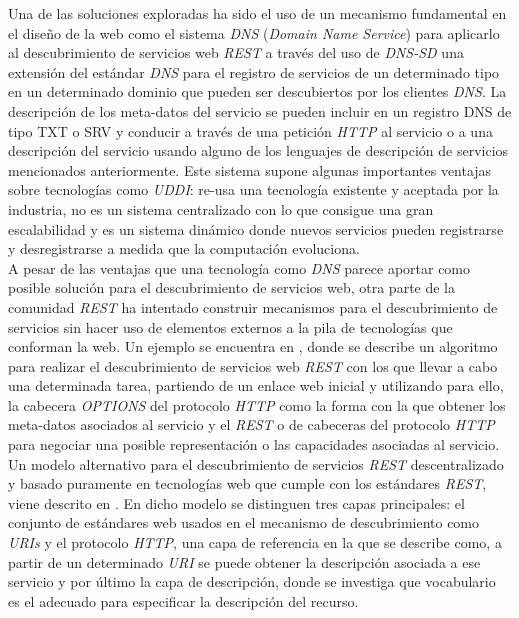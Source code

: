 Una de las soluciones exploradas ha sido el uso de un mecanismo fundamental en el dise\~no de la web como el sistema \textit{DNS} (\textit{Domain Name Service}) para aplicarlo al descubrimiento de servicios web \textit{REST} \cite{jara2012light} a trav\'es del uso de \textit{DNS-SD} una extensi\'on del est\'andar \textit{DNS} para el registro de servicios de un determinado tipo en un determinado dominio que pueden ser descubiertos por los clientes \textit{DNS}. La descripci\'on de los meta-datos del servicio se pueden incluir en un registro DNS de tipo TXT o SRV y conducir a trav\'es de una petici\'on \textit{HTTP} al servicio o a una descripci\'on del servicio usando alguno de los lenguajes de descripci\'on de servicios mencionados anteriormente. Este sistema supone algunas importantes ventajas sobre tecnolog\'ias como \textit{UDDI}: re-usa una tecnolog\'ia existente y aceptada por la industria, no es un sistema centralizado con lo que consigue una gran escalabilidad y es un sistema din\'amico donde nuevos servicios pueden registrarse y desregistrarse a medida que la computaci\'on evoluciona.\\

A pesar de las ventajas que una tecnolog\'ia como \textit{DNS} parece aportar como posible soluci\'on para el descubrimiento de servicios web, otra parte de la comunidad \textit{REST} ha intentado construir mecanismos para el descubrimiento de servicios sin hacer uso de elementos externos a la pila de tecnolog\'ias que conforman la web. Un ejemplo se encuentra en \cite{verborgh2011description}, donde se describe un algoritmo para realizar el descubrimiento de servicios web \textit{REST} con los que llevar a cabo una determinada tarea, partiendo de un enlace web inicial y utilizando para ello, la cabecera \textit{OPTIONS} del protocolo \textit{HTTP} como la forma con la que obtener los meta-datos asociados al servicio y el \textit{REST} o de cabeceras del protocolo \textit{HTTP} para negociar una posible representaci\'on o las capacidades asociadas al servicio.
Un modelo alternativo para el descubrimiento de servicios \textit{REST} descentralizado y basado puramente en tecnolog\'ias web que cumple con los est\'andares \textit{REST}, viene descrito en \cite{umbrich2009discovering}. En dicho modelo se distinguen tres capas principales: el conjunto de est\'andares web usados en el mecanismo de descubrimiento como \textit{URIs} y el protocolo \textit{HTTP}, una capa de referencia en la que se describe como, a partir de un determinado \textit{URI} se puede obtener la descripci\'on asociada a ese servicio y por \'ultimo la capa de descripci\'on, donde se investiga que vocabulario es el adecuado para especificar la descripci\'on del recurso.\\

